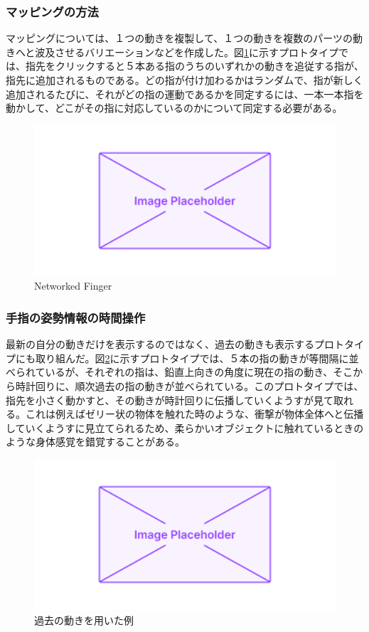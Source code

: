\subsubsection*{マッピングの方法}
マッピングについては、１つの動きを複製して、１つの動きを複数のパーツの動きへと波及させるバリエーションなどを作成した。図\ref{fig:networked_finger}に示すプロトタイプでは、指先をクリックすると５本ある指のうちのいずれかの動きを追従する指が、指先に追加されるものである。どの指が付け加わるかはランダムで、指が新しく追加されるたびに、それがどの指の運動であるかを同定するには、一本一本指を動かして、どこがその指に対応しているのかについて同定する必要がある。
\begin{figure}[H]
  \centering
  \includegraphics[width=15cm]{img/placeholder.png}
  \caption{Networked Finger}
  \label{fig:networked_finger}
\end{figure}
\subsubsection*{手指の姿勢情報の時間操作}
最新の自分の動きだけを表示するのではなく、過去の動きも表示するプロトタイプにも取り組んだ。図\ref{fig:prototype_delay}に示すプロトタイプでは、５本の指の動きが等間隔に並べられているが、それぞれの指は、鉛直上向きの角度に現在の指の動き、そこから時計回りに、順次過去の指の動きが並べられている。このプロトタイプでは、指先を小さく動かすと、その動きが時計回りに伝播していくようすが見て取れる。これは例えばゼリー状の物体を触れた時のような、衝撃が物体全体へと伝播していくようすに見立てられるため、柔らかいオブジェクトに触れているときのような身体感覚を錯覚することがある。

\begin{figure}[H]
  \centering
  \includegraphics[width=15cm]{img/placeholder.png}
  \caption{過去の動きを用いた例}
  \label{fig:prototype_delay}
\end{figure}

